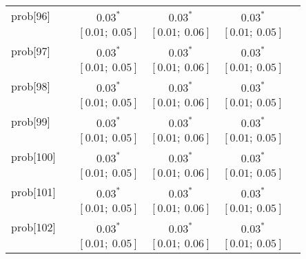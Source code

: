 \begin{table}
\begin{center}
\begin{tabular}{l c c c c c }
prob[96]    &                                  & $0.03^{*}$                & $0.03^{*}$                & $0.03^{*}$              &                         \\
            &                                  & $[0.01;\ 0.05]$           & $[0.01;\ 0.06]$           & $[0.01;\ 0.05]$         &                         \\
prob[97]    &                                  & $0.03^{*}$                & $0.03^{*}$                & $0.03^{*}$              &                         \\
            &                                  & $[0.01;\ 0.05]$           & $[0.01;\ 0.06]$           & $[0.01;\ 0.05]$         &                         \\
prob[98]    &                                  & $0.03^{*}$                & $0.03^{*}$                & $0.03^{*}$              &                         \\
            &                                  & $[0.01;\ 0.05]$           & $[0.01;\ 0.06]$           & $[0.01;\ 0.05]$         &                         \\
prob[99]    &                                  & $0.03^{*}$                & $0.03^{*}$                & $0.03^{*}$              &                         \\
            &                                  & $[0.01;\ 0.05]$           & $[0.01;\ 0.06]$           & $[0.01;\ 0.05]$         &                         \\
prob[100]   &                                  & $0.03^{*}$                & $0.03^{*}$                & $0.03^{*}$              &                         \\
            &                                  & $[0.01;\ 0.05]$           & $[0.01;\ 0.06]$           & $[0.01;\ 0.05]$         &                         \\
prob[101]   &                                  & $0.03^{*}$                & $0.03^{*}$                & $0.03^{*}$              &                         \\
            &                                  & $[0.01;\ 0.05]$           & $[0.01;\ 0.06]$           & $[0.01;\ 0.05]$         &                         \\
prob[102]   &                                  & $0.03^{*}$                & $0.03^{*}$                & $0.03^{*}$              &                         \\
            &                                  & $[0.01;\ 0.05]$           & $[0.01;\ 0.06]$           & $[0.01;\ 0.05]$         &                         \\

\end{tabular}
\end{center}
\end{table}
